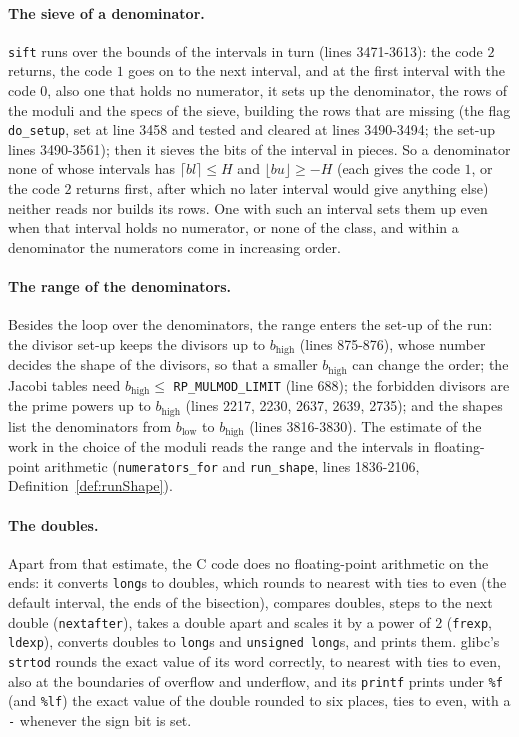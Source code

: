 \paragraph{The sieve of a denominator.} \verb|sift| runs over the bounds of the intervals in turn
(lines 3471-3613): the code $2$ returns, the code $1$ goes on to the next interval, and at the first
interval with the code $0$, also one that holds no numerator, it sets up the denominator, the rows
of the moduli and the specs of the sieve, building the rows that are missing (the flag
\verb|do_setup|, set at line 3458 and tested and cleared at lines 3490-3494; the set-up lines
3490-3561); then it sieves the bits of the interval in pieces. So a denominator none of whose
intervals has $\lceil b l \rceil \le H$ and $\lfloor b u \rfloor \ge -H$ (each gives the code $1$,
or the code $2$ returns first, after which no later interval would give anything else) neither reads
nor builds its rows. One with such an interval sets them up even when that interval holds no
numerator, or none of the class, and within a denominator the numerators come in increasing order.

\paragraph{The range of the denominators.} Besides the loop over the denominators, the range enters
the set-up of the run: the divisor set-up keeps the divisors up to $b_{\mathrm{high}}$ (lines
875-876), whose number decides the shape of the divisors, so that a smaller $b_{\mathrm{high}}$ can
change the order; the Jacobi tables need $b_{\mathrm{high}} \le$ \verb|RP_MULMOD_LIMIT| (line 688);
the forbidden divisors are the prime powers up to $b_{\mathrm{high}}$ (lines 2217, 2230, 2637, 2639,
2735); and the shapes list the denominators from $b_{\mathrm{low}}$ to $b_{\mathrm{high}}$ (lines
3816-3830). The estimate of the work in the choice of the moduli reads the range and the intervals
in floating-point arithmetic (\verb|numerators_for| and \verb|run_shape|, lines 1836-2106,
Definition~\ref{def:runShape}).

\paragraph{The doubles.} Apart from that estimate, the C code does no floating-point arithmetic on
the ends: it converts \verb|long|s to doubles, which rounds to nearest with ties to even (the
default interval, the ends of the bisection), compares doubles, steps to the next double
(\verb|nextafter|), takes a double apart and scales it by a power of $2$ (\verb|frexp|,
\verb|ldexp|), converts doubles to \verb|long|s and \verb|unsigned long|s, and prints them. glibc's
\verb|strtod| rounds the exact value of its word correctly, to nearest with ties to even, also at
the boundaries of overflow and underflow, and its \verb|printf| prints under \verb|%f| (and
\verb|%lf|) the exact value of the double rounded to six places, ties to even, with a \verb|-|
whenever the sign bit is set.

